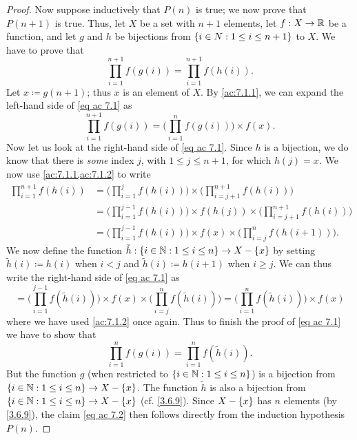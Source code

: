 \begin{proof}
  Now suppose inductively that \(P(n)\) is true;
  we now prove that \(P(n + 1)\) is true.
  Thus, let \(X\) be a set with \(n + 1\) elements, let \(f : X \to \mathbb{R}\) be a function, and let \(g\) and \(h\) be bijections from \(\left\lbrace i \in N : 1 \leq i \leq n + 1\right\rbrace\) to \(X\).
  We have to prove that
  \[
    \prod_{i = 1}^{n + 1} f(g(i)) = \prod_{i = 1}^{n + 1} f(h(i)). \tag{ac 7.1}\label{eq ac 7.1}
  \]
  Let \(x \coloneqq g(n + 1)\);
  thus \(x\) is an element of \(X\).
  By \cref{ac:7.1.1}, we can expand the left-hand side of \eqref{eq ac 7.1} as
  \[
    \prod_{i = 1}^{n + 1} f(g(i)) = \Bigg(\prod_{i = 1}^n f(g(i))\Bigg) \times f(x).
  \]
  Now let us look at the right-hand side of \eqref{eq ac 7.1}.
  Since \(h\) is a bijection, we do know that there is \emph{some} index \(j\), with \(1 \leq j \leq n + 1\), for which \(h(j) = x\).
  We now use \cref{ac:7.1.1,ac:7.1.2} to write
  \begin{align*}
    \prod_{i = 1}^{n + 1} f(h(i)) & = \Bigg(\prod_{i = 1}^j f(h(i))\Bigg) \times \Bigg(\prod_{i = j + 1}^{n + 1} f(h(i))\Bigg)                      \\
                                  & = \Bigg(\prod_{i = 1}^{j - 1} f(h(i))\Bigg) \times f(h(j)) \times \Bigg(\prod_{i = j + 1}^{n + 1} f(h(i))\Bigg) \\
                                  & = \Bigg(\prod_{i = 1}^{j - 1} f(h(i))\Bigg) \times f(x) \times \Bigg(\prod_{i = j}^n f(h(i + 1))\Bigg).
  \end{align*}
  We now define the function \(\tilde{h} : \left\lbrace i \in \mathbb{N} : 1 \leq i \leq n\right\rbrace \to X - \left\lbrace x\right\rbrace\) by setting \(\tilde{h}(i) \coloneqq h(i)\) when \(i < j\) and \(\tilde{h}(i) \coloneqq h(i + 1)\) when \(i \geq j\).
  We can thus write the right-hand side of \eqref{eq ac 7.1} as
  \[
    = \Bigg(\prod_{i = 1}^{j - 1} f(\tilde{h}(i))\Bigg) \times f(x) \times \Bigg(\prod_{i = j}^n f(\tilde{h}(i))\Bigg) = \Bigg(\prod_{i = 1}^n f(\tilde{h}(i))\Bigg) \times f(x)
  \]
  where we have used \cref{ac:7.1.2} once again.
  Thus to finish the proof of \eqref{eq ac 7.1} we have to show that
  \[
    \prod_{i = 1}^n f(g(i)) = \prod_{i = 1}^n f(\tilde{h}(i)). \tag{ac 7.2}\label{eq ac 7.2}
  \]
  But the function \(g\) (when restricted to \(\left\lbrace i \in \mathbb{N} : 1 \leq i \leq n\right\rbrace\)) is a bijection from \(\left\lbrace i \in \mathbb{N} : 1 \leq i \leq n\right\rbrace \to X - \left\lbrace x\right\rbrace\).
  The function \(\tilde{h}\) is also a bijection from \(\left\lbrace i \in \mathbb{N} : 1 \leq i \leq n\right\rbrace \to X - \left\lbrace x\right\rbrace\) (cf. \cref{3.6.9}).
  Since \(X - \left\lbrace x\right\rbrace\) has \(n\) elements (by \cref{3.6.9}), the claim \eqref{eq ac 7.2} then follows directly from the induction hypothesis \(P(n)\).
\end{proof}

